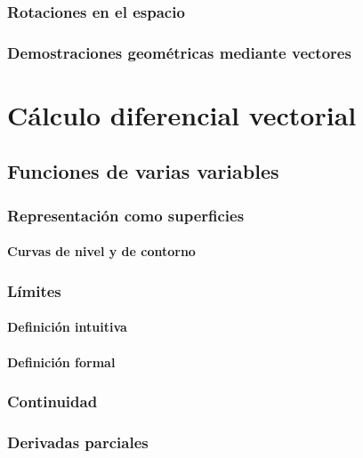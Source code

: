 \documentclass[12pt, fleqn]{report}                             %
\begin{document}
        \section{Rotaciones en el espacio}
        
        \section{Demostraciones geométricas mediante vectores}
            


\part{Cálculo diferencial vectorial}

    \chapter{Funciones de varias variables}
    
        \section{Representación como superficies}
        
            \subsection{Curvas de nivel y de contorno}
            
        \section{Límites}
            
            \subsection{Definición intuitiva}
            
            \subsection{Definición formal}
            
        \section{Continuidad}
        
        \section{Derivadas parciales}
        
\end{document}
